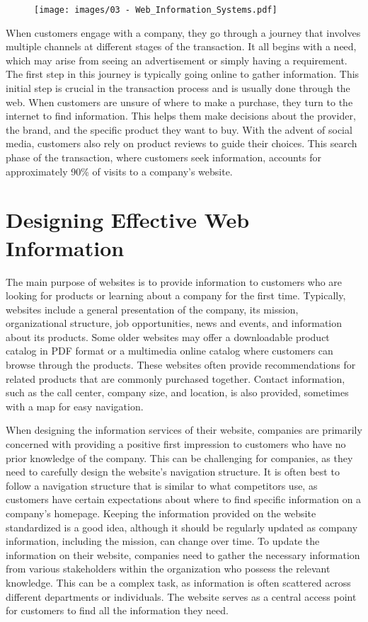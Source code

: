\begin{figure}[!h]
  \centering
  \texttt{[image: images/03 - Web\_Information\_Systems.pdf]}
\end{figure}

When customers engage with a company, they go through a journey that
involves multiple channels at different stages of the transaction. It
all begins with a need, which may arise from seeing an advertisement or
simply having a requirement. The first step in this journey is typically
going online to gather information. This initial step is crucial in the
transaction process and is usually done through the web. When customers
are unsure of where to make a purchase, they turn to the internet to
find information. This helps them make decisions about the provider, the
brand, and the specific product they want to buy. With the advent of
social media, customers also rely on product reviews to guide their
choices. This search phase of the transaction, where customers seek
information, accounts for approximately 90\% of visits to a company's
website.

\section{Designing Effective Web
  Information}\label{designing-effective-web-information}

The main purpose of websites is to provide information to customers who
are looking for products or learning about a company for the first time.
Typically, websites include a general presentation of the company, its
mission, organizational structure, job opportunities, news and events,
and information about its products. Some older websites may offer a
downloadable product catalog in PDF format or a multimedia online
catalog where customers can browse through the products. These websites
often provide recommendations for related products that are commonly
purchased together. Contact information, such as the call center,
company size, and location, is also provided, sometimes with a map for
easy navigation.

When designing the information services of their website, companies are
primarily concerned with providing a positive first impression to
customers who have no prior knowledge of the company. This can be
challenging for companies, as they need to carefully design the
website's navigation structure. It is often best to follow a navigation
structure that is similar to what competitors use, as customers have
certain expectations about where to find specific information on a
company's homepage. Keeping the information provided on the website
standardized is a good idea, although it should be regularly updated as
company information, including the mission, can change over time. To
update the information on their website, companies need to gather the
necessary information from various stakeholders within the organization
who possess the relevant knowledge. This can be a complex task, as
information is often scattered across different departments or
individuals. The website serves as a central access point for customers
to find all the information they need.

